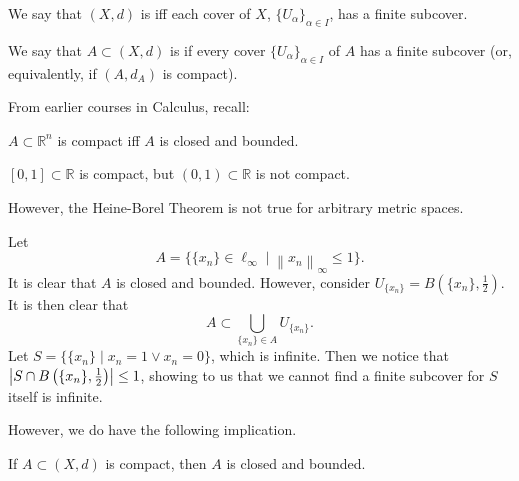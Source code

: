 \documentclass[notoc,notitlepage]{tufte-book}
\newcommand{\norm}[1]{\left\| #1 \right\|}
\begin{document}
\begin{defn}[Compact]\label{defn:compact}
  We say that $(X, d)$ is  iff each cover of $X$, $\{ U_\alpha \}_{\alpha \in I}$, has a finite subcover.

  We say that $A \subset (X, d)$ is  if every cover $\{ U_\alpha \}_{\alpha \in I}$ of $A$ has a finite subcover (or, equivalently, if $(A, d_A)$ is compact).
\end{defn}

From earlier courses in Calculus, recall:

\begin{thm}\label{thm:heine_borel_theorem}
  $A \subset \mathbb{R}^n$ is compact iff $A$ is closed and bounded.
\end{thm}

\begin{eg}
  $[0, 1] \subset \mathbb{R}$ is compact, but $(0, 1) \subset \mathbb{R}$ is not compact.
\end{eg}

However, the Heine-Borel Theorem is not true for arbitrary metric spaces.

\begin{eg}[\imponote]
  Let
  \begin{equation*}
    A = \{ \{ x_n \} \in \ell_\infty \mid \norm{ x_n }_\infty \leq 1 \}.
  \end{equation*}
  It is clear that $A$ is closed and bounded. However, consider $U_{\{ x_n \}} = B \left( \{ x_n \}, \frac{1}{2} \right)$. It is then clear that
  \begin{equation*}
    A \subset \bigcup_{\{ x_n \} \in A } U_{\{ x_n \}}.
  \end{equation*}
  Let $S = \{ \{ x_n \} \mid x_n = 1 \lor x_n = 0 \}$, which is infinite. Then we notice that $\left| S \cap B \left( \{ x_n \}, \frac{1}{2} \right) \right| \leq 1$, showing to us that we cannot find a finite subcover for $S$ itself is infinite.
\end{eg}

However, we do have the following implication.

\begin{propo}\label{propo:compact_spaces_are_closed_and_bounded}
  If $A \subset (X, d)$ is compact, then $A$ is closed and bounded.
\end{propo}
\end{document}
